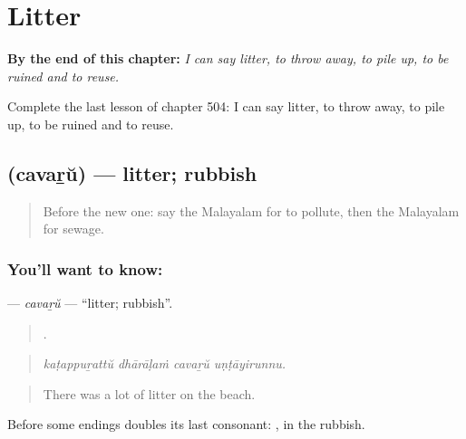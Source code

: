 
\chapter{Litter}
\label{ch:ml-litter}

\begin{chapteropening}
\textbf{By the end of this chapter:} \emph{I can say litter, to throw away, to pile up, to be ruined and to reuse.}

Complete the last lesson of chapter 504: I can say litter, to throw away, to pile up, to be ruined and to reuse.
\end{chapteropening}

\section[\texorpdfstring{\ml{ചവറ്} (cavaṟŭ)}{ചവറ് (cavaṟŭ)}]{ (cavaṟŭ) — litter; rubbish}

\label{lesson:ML-C504-cavaru}



\begin{quote}
Before the new one: say the Malayalam for to pollute, then the Malayalam for sewage.
\end{quote}

\subsection*{You'll want to know: }
\textbf{} — \emph{cavaṟŭ} — \textquotedblleft{}litter; rubbish\textquotedblright{}.

\begin{quote}
   .
\end{quote}

\begin{quote}
\emph{kaṭappuṟattŭ dhārāḷaṁ cavaṟŭ uṇṭāyirunnu.}
\end{quote}

\begin{quote}
There was a lot of litter on the beach.
\end{quote}

Before some endings  doubles its last consonant: , in the rubbish.

